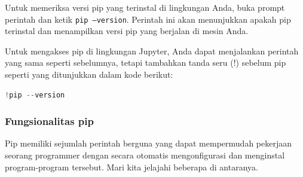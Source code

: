 \documentclass{article}
\begin{document}
Untuk memeriksa versi pip yang terinstal di lingkungan Anda, buka prompt perintah dan ketik \verb|pip –version|. Perintah ini akan menunjukkan apakah pip terinstal dan menampilkan versi pip yang berjalan di mesin Anda.

Untuk mengakses pip di lingkungan Jupyter, Anda dapat menjalankan perintah yang sama seperti sebelumnya, tetapi tambahkan tanda seru (!) sebelum pip seperti yang ditunjukkan dalam kode berikut:
\begin{lstlisting}[language=Python, caption={}, captionpos=b]
!pip --version
\end{lstlisting}

\subsubsection{Fungsionalitas pip}
Pip memiliki sejumlah perintah berguna yang dapat mempermudah pekerjaan seorang programmer dengan secara otomatis mengonfigurasi dan menginstal program-program tersebut. Mari kita jelajahi beberapa di antaranya.
\end{document}
